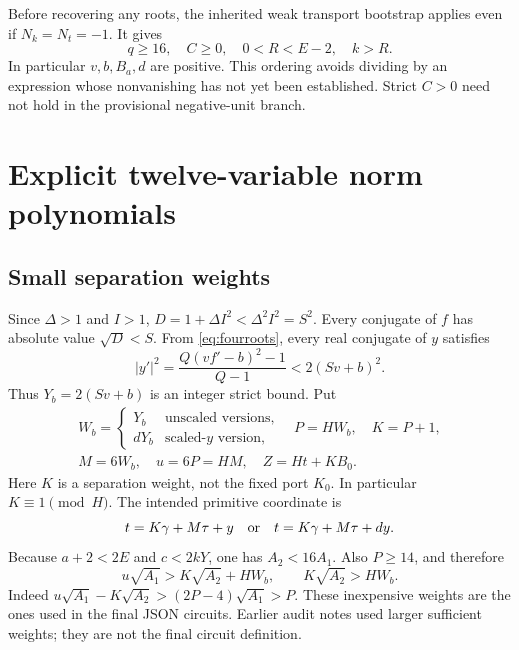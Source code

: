 \documentclass[11pt]{article}
\begin{document}
Before recovering any roots, the inherited weak transport bootstrap applies even if $N_k=N_t=-1$. It gives
\[
 q\ge16,\quad C\ge0,\quad 0<R<E-2,\quad k>R.
\]
In particular $v,b,B_a,d$ are positive. This ordering avoids dividing by an expression whose nonvanishing has not yet been established. Strict $C>0$ need not hold in the provisional negative-unit branch.

\section{Explicit twelve-variable norm polynomials}\label{sec:norm}

\subsection{Small separation weights}
Since $\Delta>1$ and $I>1$, $D=1+\Delta I^2<\Delta^2I^2=S^2$. Every conjugate of $f$ has absolute value $\sqrt D<S$. From \eqref{eq:fourroots}, every real conjugate of $y$ satisfies
\[
 |y'|^2=\frac{Q(vf'-b)^2-1}{Q-1}<2(Sv+b)^2.
\]
Thus $Y_b=2(Sv+b)$ is an integer strict bound. Put
\begin{equation}\label{eq:weights}\begin{gathered}
 W_b=\begin{cases}Y_b&\text{unscaled versions},\\dY_b&\text{scaled-$y$ version},\end{cases}
 \quad P=HW_b,\quad K=P+1,\\ M=6W_b,\quad u=6P=HM,
 \quad Z=Ht+KB_0.
\end{gathered}\end{equation}
Here $K$ is a separation weight, not the fixed port $K_0$. In particular $K\equiv1\pmod H$. The intended primitive coordinate is
\[
 t=K\gamma+M\tau+y\quad\hbox{or}\quad t=K\gamma+M\tau+dy.
\]
Because $a+2<2E$ and $c<2kY$, one has $A_2<16A_1$. Also $P\ge14$, and therefore
\begin{equation}\label{eq:dominance}
 u\sqrt{A_1}>K\sqrt{A_2}+HW_b,\qquad K\sqrt{A_2}>HW_b.
\end{equation}
Indeed $u\sqrt{A_1}-K\sqrt{A_2}>(2P-4)\sqrt{A_1}>P$. These inexpensive weights are the ones used in the final JSON circuits. Earlier audit notes used larger sufficient weights; they are not the final circuit definition.
\end{document}

